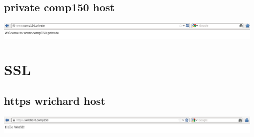 \documentclass[a4paper,10pt]{article}
\begin{document}
\subsection{private comp150 host}
\begin{center}
  \includegraphics[width=\linewidth]{./comp150_private.png}
  \end{center}

\section{SSL}
\subsection{https wrichard host}
\begin{center}
  \includegraphics[width=\linewidth]{./https.png}
  \end{center}
\end{document}
